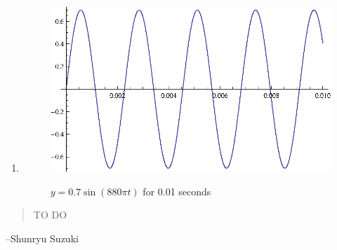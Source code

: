 \documentclass{exam}
\begin{document}
\begin{description}
\begin{enumerate}[a]
        \item
          \begin{figure}[H]
            \centering
            \includegraphics[scale=1.0]{exercise76.eps}

            $y = 0.7 \sin \left( 880 \pi t \right)$ for 0.01 seconds
          \end{figure}

      \end{enumerate}

    \end{description}
  \else
    \vspace{1 cm}
    \begin{quote}
      \begin{em}
        TO DO
      \end{em}
    \end{quote}
    \hspace{1 cm} --Shunryu Suzuki
  \fi
\end{document}
